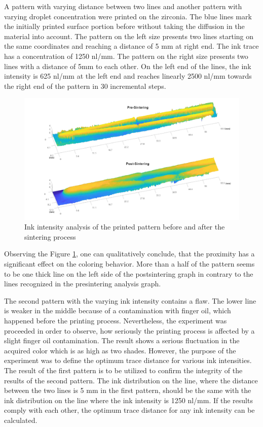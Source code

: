 \bigskip

A pattern with varying distance between two lines and another pattern with varying droplet concentration were printed on the zirconia. The blue lines mark the initially printed surface portion before without taking the diffusion in the material into account. The pattern on the left size presents two lines starting on the same coordinates and reaching a distance of 5 mm at right end. The ink trace has a concentration of 1250 nl/mm. The pattern on the right size presents two lines with a distance of 5mm to each other. On the left end of the lines, the ink intensity is 625 nl/mm at  the left end and reaches linearly 2500 nl/mm towards the right end of the pattern in 30 incremental steps.

\bigskip

\begin{figure}[H]
	\centering
	\includegraphics[width=1\textwidth]{grafiken/prepostV.jpg}
	\caption{Ink intensity analysis of the printed pattern before and after the sintering process}
	\label{fig:prepostV}
\end{figure} 

\bigskip

Observing the Figure \ref{fig:prepostV}, one can qualitatively conclude, that the proximity has a significant effect on the coloring behavior. More than a half of the pattern seems to be one thick line on the left side of the postsintering graph in contrary to the lines recognized in the presintering analysis graph. 

The second pattern with the varying ink intensity contains a flaw. The lower line is weaker in the middle because of a contamination with finger oil, which happened before the printing process. Nevertheless, the experiment was proceeded in order to observe, how seriously the printing process is affected by a slight finger oil contamination. The result shows a serious fluctuation in the acquired color which is as high as two shades. However, the purpose of the experiment was to define the optimum trace distance for various ink intensities. The result of the first pattern is to be utilized to confirm the integrity of the results of the second pattern. The ink distribution on the line, where the distance between the two lines is 5 mm in the first pattern, should be the same with the ink distribution on the line where the ink intensity is 1250 nl/mm. If the results comply with each other, the optimum trace distance for any ink intensity can be calculated.


